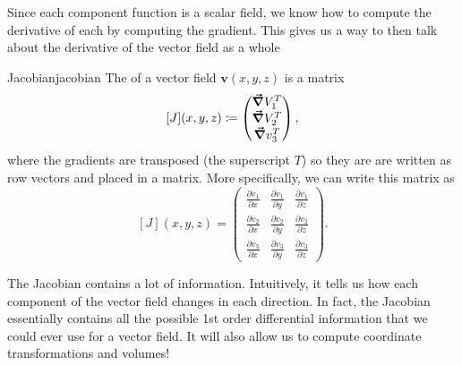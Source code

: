 		        Since each component function is a scalar field, we know how to compute the derivative of each by computing the gradient.  This gives us a way to then talk about the derivative of the vector field as a whole
		        
		        \begin{df}{Jacobian}{jacobian}
		        The  of a vector field $\mathbf{v}(x,y,z)$ is a matrix
		        \[
		        [J](x,y,z)\coloneqq \begin{pmatrix} \boldsymbol{\vec{\nabla}} V_1^T \\ \boldsymbol{\vec{\nabla}} V_2^T \\ \boldsymbol{\vec{\nabla}} v_3^T \end{pmatrix},
		        \]
		        where the gradients are transposed (the superscript $T$) so they are are written as row vectors and placed in a matrix. More specifically, we can write this matrix as 
		        \[
		        [J](x,y,z) = \begin{pmatrix} \frac{\partial v_1}{\partial x} & \frac{\partial v_1}{\partial y} & \frac{\partial v_1}{\partial z}\\ \frac{\partial v_2}{\partial x} & \frac{\partial v_2}{\partial y} & \frac{\partial v_2}{\partial z} \\ \frac{\partial v_3}{\partial x} & \frac{\partial v_3}{\partial y} & \frac{\partial v_3}{\partial z} \end{pmatrix}.
		        \]
		        \end{df}
		        
		        The Jacobian contains a lot of information. Intuitively, it tells us how each component of the vector field changes in each direction.  In fact, the Jacobian essentially contains all the possible 1st order differential information that we could ever use for a vector field.  It will also allow us to compute coordinate transformations and volumes!
		        

